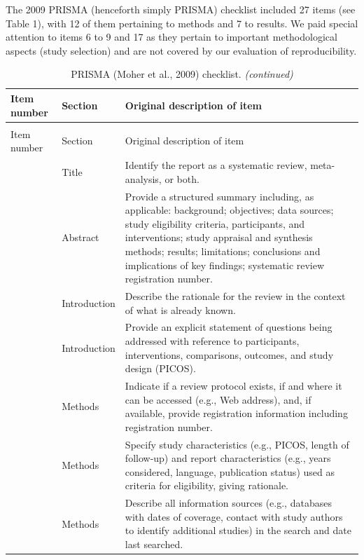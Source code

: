 \documentclass[
  man,floatsintext]{apa6}
\begin{document}
The 2009 PRISMA (henceforth simply PRISMA) checklist included 27 items (see Table 1), with 12 of them pertaining to methods and 7 to results. We paid special attention to items 6 to 9 and 17 as they pertain to important methodological aspects (study selection) and are not covered by our evaluation of reproducibility.

\newpage
\singlespacing
\begingroup\fontsize{10}{12}\selectfont

\begin{longtable}[t]{>{\raggedleft\arraybackslash}p{5em}>{\raggedright\arraybackslash}p{5em}>{\raggedright\arraybackslash}p{32em}}
\caption{\label{tab:table1}PRISMA (Moher et al., 2009) checklist.}\\
\toprule
Item number & Section & Original description of item\\
\midrule
\endfirsthead
\caption[]{\label{tab:table1}PRISMA (Moher et al., 2009) checklist. \textit{(continued)}}\\
\toprule
Item number & Section & Original description of item\\
\midrule
\endhead
\midrule
\multicolumn{3}{r@{}}{}\
\endfoot
\bottomrule
\endlastfoot
1 & Title & Identify the report as a systematic review, meta-analysis, or both.\\
2 & Abstract & Provide a structured summary including, as applicable: background; objectives; data sources; study eligibility criteria, participants, and interventions; study appraisal and synthesis methods; results; limitations; conclusions and implications of key findings; systematic review registration number.\\
3 & Introduction & Describe the rationale for the review in the context of what is already known.\\
4 & Introduction & Provide an explicit statement of questions being addressed with reference to participants, interventions, comparisons, outcomes, and study design (PICOS).\\
5 & Methods & Indicate if a review protocol exists, if and where it can be accessed (e.g., Web address), and, if available, provide registration information including registration number.\\
6 & Methods & Specify study characteristics (e.g., PICOS, length of follow-up) and report characteristics (e.g., years considered, language, publication status) used as criteria for eligibility, giving rationale.\\
7 & Methods & Describe all information sources (e.g., databases with dates of coverage, contact with study authors to identify additional studies) in the search and date last searched.\\

\end{longtable}
\end{document}
